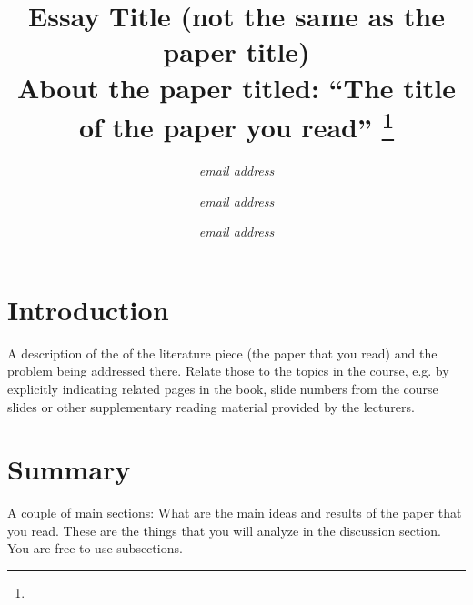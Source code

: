 \documentclass[conference]{IEEEtran}
\begin{document}
%
%
\title{Essay Title (not the same as the paper title)\\
{\footnotesize \textsuperscript{}About the paper titled: “The title of the paper you read”
}
\thanks{}
}
%
%
\author{
\textit{email address}
\and
{}
\textit{email address}
\and
{}
\textit{email address}
}
\maketitle
%
%
%
\section{Introduction}
A description of the of the literature piece (the paper that you read) and the problem being addressed there. Relate those to the topics in the course, e.g. by explicitly indicating related pages in the book, slide numbers from the course slides or other supplementary reading material provided by the lecturers.
%
%
\section{Summary}
A couple of main sections: What are the main ideas and results of the paper that you read. These are the things that you will analyze in the discussion section. You are free to use subsections.
%
%
\end{document}
